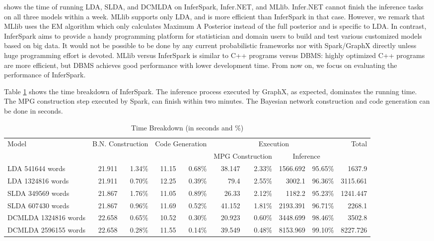 shows the time of running LDA, SLDA, and DCMLDA 
on InferSpark, Infer.NET, and MLlib.
Infer.NET cannot finish the inference tasks on all three models within a week.
MLlib supports only LDA, and is more efficient than InferSpark in that case.
However, we remark that MLlib uses the EM algorithm which only
calculates Maximum A Posterior instead of the full posterior and is specific to LDA.
In contrast, InferSpark aims to provide a handy programming platform for statistician and domain users to build and test various customized models based on big data.
It would not be possible to be done by any current probabilistic frameworks nor with Spark/GraphX directly unless huge programming effort is devoted.  
MLlib versus InferSpark 
is similar to C++ programs versus DBMS: highly optimized C++ programs are more efficient, 
but DBMS achieves good performance with lower development time.
From now on, we focus on evaluating the performance of InferSpark.



Table \ref{breakdown} shows the time breakdown of InferSpark.
The inference process executed by GraphX, as expected, dominates the running time.
The MPG construction step executed by Spark, can finish within two minutes.
The Bayesian network construction and code generation can be done in seconds.


\begin{table}
\caption{Time Breakdown (in seconds and \%)}
\label{breakdown}
\begin{tabular}{|l||*{8}{r|}r|}
\hline
Model & \multicolumn{2}{c|}{B.N. Construction} & \multicolumn{2}{c|}{Code Generation}	& \multicolumn{4}{c|}{Execution} & Total \\\cline{6-9} 
  & \multicolumn{2}{c|}{ } & \multicolumn{2}{c|}{ }	& \multicolumn{2}{c|}{MPG Construction} & \multicolumn{2}{c|}{Inference} &	 \\ \hline \hline
LDA 541644 words	& 21.911	& 1.34\%	& 11.15 &	0.68\%	& 38.147	& 2.33\% &	1566.692 & 95.65\%	& 1637.9 \\ \hline
LDA 1324816 words &	21.911 & 0.70\% & 12.25	& 0.39\% & 79.4 & 2.55\%	& 3002.1 & 96.36\% &	3115.661 \\ \hline
SLDA 349569 words &	21.867 & 1.76\% & 11.05 &	0.89\%	& 26.33 & 2.12\% &	1182.2	& 95.23\%	& 1241.447 \\ \hline
SLDA 607430 words & 21.867 & 0.96\%	& 11.69	& 0.52\% & 41.152	& 1.81\%	& 2193.391	& 96.71\%	& 2268.1 \\ \hline
DCMLDA 1324816 words & 22.658 & 0.65\%	& 10.52 & 0.30\% &	20.923	& 0.60\% & 3448.699	& 98.46\% &	3502.8 \\ \hline
DCMLDA 2596155 words & 22.658 & 0.28\% & 11.55 & 0.14\%	& 39.549 & 0.48\%	& 8153.969 & 99.10\%	& 8227.726 \\ \hline

\end{tabular}
\end{table} 





